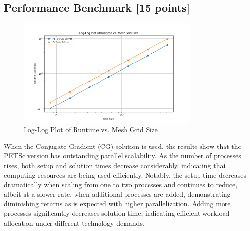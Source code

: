 \documentclass[unicode,11pt,a4paper,oneside,numbers=endperiod,openany]{scrartcl}
\begin{document}
\subsection{Performance Benchmark [15 points]}

\begin{figure}[h]
    \centering
    \includegraphics[width=0.8\textwidth]{images/Figure_1.png}
    \caption{Log-Log Plot of Runtime vs. Mesh Grid Size}
\end{figure}

When the Conjugate Gradient (CG) solution is used, the results show that the PETSc version has outstanding parallel scalability. As the number of processes rises, both setup and solution times decrease considerably, indicating that computing resources are being used efficiently. Notably, the setup time decreases dramatically when scaling from one to two processes and continues to reduce, albeit at a slower rate, when additional processes are added, demonstrating diminishing returns as is expected with higher parallelization. Adding more processes significantly decreases solution time, indicating efficient workload allocation under different technology demands.
                  
\end{document}
